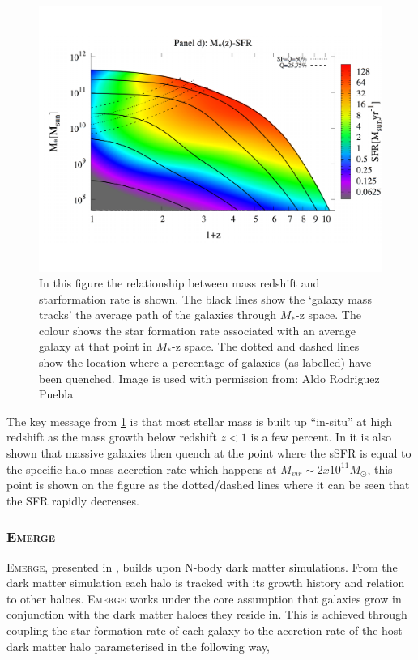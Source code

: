 \begin{figure}[h]
    \centering
    \includegraphics[width = \linewidth]{Figures/Chapter1/RP17_fig9.pdf}
    \caption{In this figure the relationship between mass redshift and starformation rate is shown. The black lines show the `galaxy mass tracks' the average path of the galaxies through $M_*$-z space. The colour shows the star formation rate associated with an average galaxy at that point in $M_*$-z space. The dotted and dashed lines show the location where a percentage of galaxies (as labelled) have been quenched.
    Image is used with permission from: Aldo Rodriguez Puebla \cite{Rodriguez-Puebla2017ConstrainingProperties}}
    \label{fig:RP_fig}
\end{figure}


The key message from \ref{fig:RP_fig} is that most stellar mass is built up ``in-situ'' at high redshift as the mass growth below redshift $z<1$ is a few percent. In \citet{Rodriguez-Puebla2017ConstrainingProperties} it is also shown that massive galaxies then quench at the point where the sSFR is equal to the specific halo mass accretion rate which happens at $M_{vir} \sim 2 x 10^{11} M_{\odot}$, this point is shown on the figure as the dotted/dashed lines where it can be seen that the SFR rapidly decreases.


\subsubsection{E\textsc{merge}}
E\textsc{merge}, presented in \citet{Moster2018Emerge10}, builds upon N-body dark matter simulations. From the dark matter simulation each halo is tracked with its growth history and relation to other haloes. E\textsc{merge} works under the core assumption that galaxies grow in conjunction with the dark matter haloes they reside in. This is achieved through coupling the star formation rate of each galaxy to the accretion rate of the host dark matter halo parameterised in the following way,

